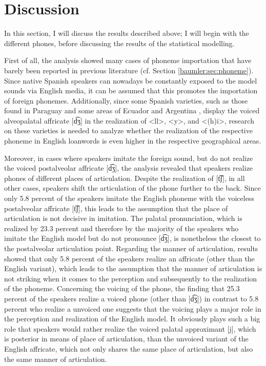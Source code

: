 \documentclass[output=paper]{langscibook}
\begin{document}
\section{Discussion} \label{baumler:sec:dis}
In this section, I will discuss the results described above; I will begin with the different phones, before discussing the results of the statistical modelling.

First of all, the analysis showed many cases of phoneme importation that have barely been reported in previous literature (cf. Section  \ref{baumler:sec:phoneme}). 
Since native Spanish speakers can nowadays be constantly exposed to the model sounds via English media, it can be assumed that this promotes the importation of foreign phonemes.
Additionally, since some Spanish varieties, such as those found in Paraguay and some areas of Ecuador and Argentina \citep[226]{2011Ngdl}, display the voiced alveopalatal affricate [d͡ʒ] in the realization of <ll>, <y>, and <(h)i>, research on these varieties is needed to analyze whether the realization of the respective phoneme in English loanwords is even higher in the respective geographical areas.

Moreover, in cases where speakers imitate the foreign sound, but do not realize the voiced postalveolar affricate [d͡ʒ], the analysis revealed that speakers realize phones of different places of articulation. Despite the realization of [t͡ʃ], in all other cases, speakers shift the articulation of the phone further to the back. Since only 5.8 percent of the speakers imitate the English phoneme with the voiceless postalveolar affricate [t͡ʃ], this leads to the assumption that the place of articulation is not decisive in imitation. The palatal pronunciation, which is realized by 23.3 percent and therefore by the majority of the speakers who imitate the English model but do not pronounce [d͡ʒ], is nonetheless the closest to the postalveolar articulation point.
Regarding the manner of articulation, results showed that only 5.8 percent of the speakers realize an affricate (other than the English variant), which leads to the assumption that the manner of articulation is not striking when it comes to the perception and subsequently to the realization of the phoneme. Concerning the voicing of the phone, the finding that 25.3 percent of the speakers realize a voiced phone (other than [d͡ʒ]) in contrast to 5.8 percent who realize a unvoiced one suggests that the voicing plays a major role in the perception and realization of the English model. It obviously plays such a big role that speakers would rather realize the voiced palatal approximant [j], which is posterior in means of place of articulation, than the unvoiced variant of the English affricate, which not only shares the same place of articulation, but also the same manner of articulation.
\end{document}
